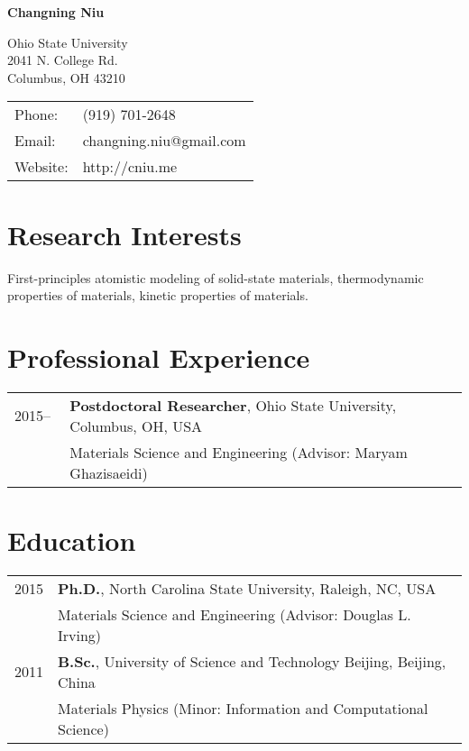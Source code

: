 \documentclass[letterpaper,11pt]{article}
\def\name{Changning Niu}
\begin{document}
\thispagestyle{empty}
\centerline{\huge \bf \sc \name}

\vspace{0.25in}

\begin{minipage}{0.50\linewidth}
  Ohio State University \\
  2041 N. College Rd.\\
  Columbus, OH 43210
\end{minipage}
\begin{minipage}{0.50\linewidth}
  \begin{tabular}{ll}
    Phone: & (919) 701-2648 \\
    Email: & changning.niu@gmail.com \\
    Website: & http://cniu.me \\
  \end{tabular}
\end{minipage}


\section*{Research Interests}

First-principles atomistic modeling of solid-state materials, thermodynamic properties of materials, kinetic properties of materials.

\section*{Professional Experience}

\begin{tabular}{ll}
2015--\,\,  & \textbf{Postdoctoral Researcher}, Ohio State University, Columbus, OH, USA \\
		   & Materials Science and Engineering (Advisor: Maryam Ghazisaeidi)
\end{tabular}


\section*{Education}

\begin{tabular}{ll}
	2015 & {\bf Ph.D.}, North Carolina State University, Raleigh, NC, USA \\
	     & Materials Science and Engineering (Advisor: Douglas L. Irving) \\
	2011 & {\bf B.Sc.}, University of Science and Technology Beijing, Beijing, China \\
		 & Materials Physics (Minor: Information and Computational Science) \\
\end{tabular}
\end{document}
